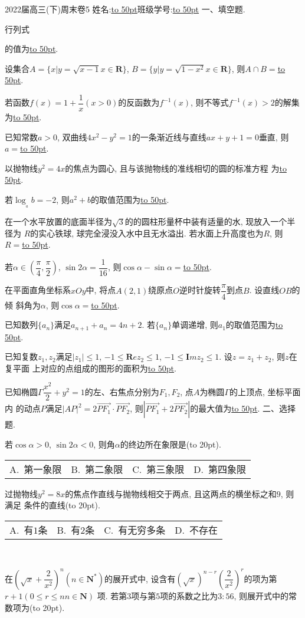 \documentclass[10pt,a4paper]{article}
\newcommand{\blank}[1]{\underline{\hbox to #1pt{}}}
\newcommand{\bracket}[1]{(\hbox to #1pt{})}
\newcommand{\fourch}[4]{\par\begin{tabular}{p{.23\textwidth}p{.23\textwidth}p{.23\textwidth}p{.23\textwidth}}
A.~#1 &B.~#2& C.~#3& D.~#4
\end{tabular}}
\begin{document}
2022届高三(下)周末卷5
姓名:\blank{50}班级学号:\blank{50}
一、填空题.
\item 行列式
\item 的值为\blank{50}.
\item 设集合$A=\{x|y=\sqrt {x-1}x\in \mathbf{R}\}$, $B=\{y|y=\sqrt {1-x^2}x\in \mathbf{R}\}$, 则$A\cap B=$\blank{50}.
\item 若函数$f(x)=1+\dfrac 1x(x>0)$的反函数为$f^{-1}(x)$, 则不等式$f^{-1}(x)>2$的解集为\blank{50}.
\item 已知常数$a>0$, 双曲线$4x^2-y^2=1$的一条渐近线与直线$ax+y+1=0$垂直, 则	$a=$\blank{50}.
\item 以抛物线$y^2=4x$的焦点为圆心, 且与该抛物线的准线相切的圆的标准方程	为\blank{50}.
\item 若$\log__ab=-2$, 则$a^2+b$的取值范围为\blank{50}.
\item 在一个水平放置的底面半径为$\sqrt 3$的的圆柱形量杯中装有适量的水, 现放入一个半径为	$R$的实心铁球, 球完全浸没入水中且无水溢出. 若水面上升高度也为$R$, 则	$R=$\blank{50}.
\item 若$\alpha \in (\dfrac{\pi }4,\dfrac{\pi }2)$, $\sin 2\alpha =\dfrac 1{16}$, 则$\cos \alpha -\sin \alpha =$\blank{50}.
\item 在平面直角坐标系$xOy$中, 将点$A(2,1)$绕原点$O$逆时针旋转$\dfrac{\pi }4$到点$B$. 设直线$OB$的倾	斜角为$\alpha$, 则$\cos \alpha =$\blank{50}.
\item 已知数列$\{a_n\}$满足$a_{n+1}+a_n=4n+2$. 若$\{a_n\}$单调递增, 则$a_1$的取值范围为\blank{50}.
\item 已知复数$z_1,z_2$满足$|z_1|\le 1$, $-1\le \mathbf Rez_2\le 1$, $-1\le \mathbf Imz_2\le 1$. 设$z=z_1+z_2$, 则$z$在复平面	上对应的点组成的图形的面积为\blank{50}.
\item 已知椭圆$\Gamma \dfrac{x^2}2+y^2=1$的左、右焦点分别为$F_1,F_2$, 点$A$为椭圆$\Gamma$的上顶点, 坐标平面内	的动点$P$满足$|AP|^2=2\overrightarrow{PF_1}\cdot \overrightarrow{PF_2}$, 则$|\overrightarrow{PF_1}+2\overrightarrow{PF_2}|$的最大值为\blank{50}.
二、选择题.
\item 若$\cos \alpha >0$, $\sin 2\alpha <0$, 则角$\alpha$的终边所在象限是\bracket{20}.
	\fourch{第一象限}{第二象限}{第三象限}{第四象限}
\item 过抛物线$y^2=8x$的焦点作直线与抛物线相交于两点, 且这两点的横坐标之和$9$, 则满足	条件的直线\bracket{20}.
	\fourch{有$1$条}{有$2$条}{有无穷多条}{不存在}
 
\item 在$(\sqrt x+\dfrac 2{x^2})^n(n\in \mathbf{N}^*)$的展开式中, 设含有$(\sqrt x)^{n-r}(\dfrac 2{x^2})^r$的项为第$r+1(0\le r\le nn\in \mathbf{N})$	项. 若第$3$项与第$5$项的系数之比为$3:56$, 则展开式中的常数项为\bracket{20}.
\end{document}
